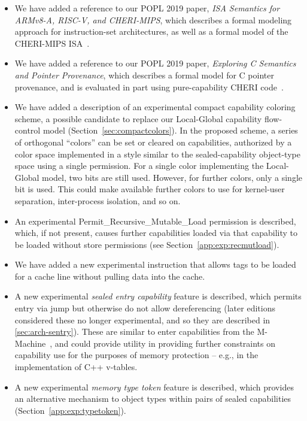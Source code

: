 \begin{itemize}
\item We have added a reference to our POPL 2019 paper, \textit{ISA Semantics
  for ARMv8-A, RISC-V, and CHERI-MIPS}, which describes a formal modeling
  approach for instruction-set architectures, as well as a formal model of the
  CHERI-MIPS ISA~\cite{sail-popl2019}.

\item We have added a reference to our POPL 2019 paper, \textit{Exploring C
  Semantics and Pointer Provenance}, which describes a formal model for C
  pointer provenance, and is evaluated in part using pure-capability CHERI
  code~\cite{cerberus-popl2019}.

\item We have added a description of an experimental compact capability
  coloring scheme, a possible candidate to replace our Local-Global capability
  flow-control model (Section~\ref{sec:compactcolors}).
  In the proposed scheme, a series of orthogonal ``colors'' can be set or
  cleared on capabilities, authorized by a color space implemented in a
  style similar to the sealed-capability object-type space using a single
  permission.
  For a single color implementing the Local-Global model, two bits are still
  used.
  However, for further colors, only a single bit is used.
  This could make available further colors to use for kernel-user separation,
  inter-process isolation, and so on.

\item An experimental Permit\_Recursive\_Mutable\_Load permission is
  described, which, if not present, causes further capabilities loaded via
  that capability to be loaded without store permissions
  (see Section~\ref{app:exp:recmutload}).

\item We have added a new experimental 
  instruction that allows tags to be loaded for a cache line without pulling
  data into the cache.

\item A new experimental \textit{sealed entry capability} feature is
  described, which permits entry via jump but otherwise do not allow
  dereferencing (later editions considered these no longer experimental, and
  so they are described in \cref{sec:arch-sentry}).
  These are similar to enter capabilities from the
  M-Machine~\cite{carter:mmachine94}, and could provide utility in providing
  further constraints on capability use for the purposes of memory protection
  -- e.g., in the implementation of C++ v-tables.

\item A new experimental \textit{memory type token} feature is described,
  which provides an alternative mechanism to object types within pairs of
  sealed capabilities (Section~\ref{app:exp:typetoken}).

\end{itemize}
